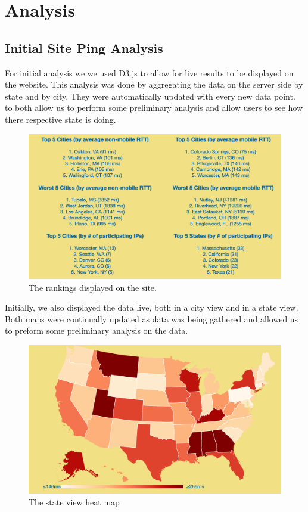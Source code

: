 \section{Analysis}\label{sec:results_web_ping} %
\subsection{Initial Site Ping Analysis}
For initial analysis we we used D3.js to allow for live results to be displayed on the website. This analysis was done by aggregating the data on the server side by state and by city. They were automatically updated with every new data point. to both allow us to perform some preliminary analysis and allow users to see how there respective state is doing.

\begin{figure}
    \centering
    \includegraphics[width=\textwidth]{images/siteping/Sitping_Rankings.png}
    \caption{The rankings displayed on the site.}
    \label{fig:siteping_rankings}
\end{figure}

Initially, we also displayed the data live, both in a city view and in a state view. Both maps were continually updated as data was being gathered and allowed us to preform some preliminary analysis on the data.

\begin{figure}
    \centering
    \includegraphics[width=\textwidth]{images/siteping/Siteping_state_map.png}
    \caption{The state view heat map}
    \label{fig:siteping_state_view}
\end{figure}


